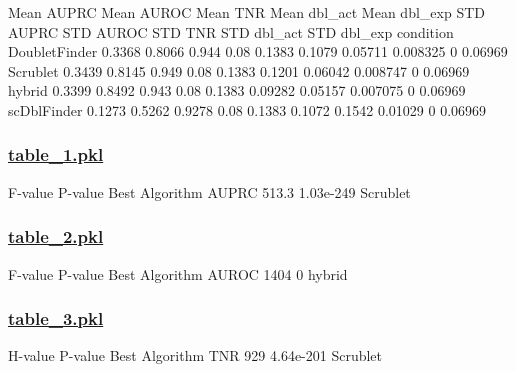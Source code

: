 \documentclass[11pt]{article}
\begin{document}
\begin{codeoutput}
               Mean AUPRC  Mean AUROC  Mean TNR  Mean dbl\_act  Mean dbl\_exp  STD AUPRC  STD AUROC  STD TNR  STD dbl\_act  STD dbl\_exp
condition                                                                                                                           
DoubletFinder      0.3368      0.8066     0.944          0.08        0.1383     0.1079    0.05711 0.008325            0      0.06969
Scrublet           0.3439      0.8145     0.949          0.08        0.1383     0.1201    0.06042 0.008747            0      0.06969
hybrid             0.3399      0.8492     0.943          0.08        0.1383    0.09282    0.05157 0.007075            0      0.06969
scDblFinder        0.1273      0.5262    0.9278          0.08        0.1383     0.1072     0.1542  0.01029            0      0.06969
\end{codeoutput}\hypertarget{file-table-1-pkl}{}

\subsubsection*{\hyperlink{code-Data Analysis-table-1-pkl}{table\_1.pkl}}

\begin{codeoutput}
       F-value    P-value Best Algorithm
AUPRC    513.3  1.03e-249       Scrublet
\end{codeoutput}\hypertarget{file-table-2-pkl}{}

\subsubsection*{\hyperlink{code-Data Analysis-table-2-pkl}{table\_2.pkl}}

\begin{codeoutput}
       F-value P-value Best Algorithm
AUROC     1404       0         hybrid
\end{codeoutput}\hypertarget{file-table-3-pkl}{}

\subsubsection*{\hyperlink{code-Data Analysis-table-3-pkl}{table\_3.pkl}}

\begin{codeoutput}
     H-value    P-value Best Algorithm
TNR      929  4.64e-201       Scrublet
\end{codeoutput}\hypertarget{file-additional-results-pkl}{}
\end{document}

